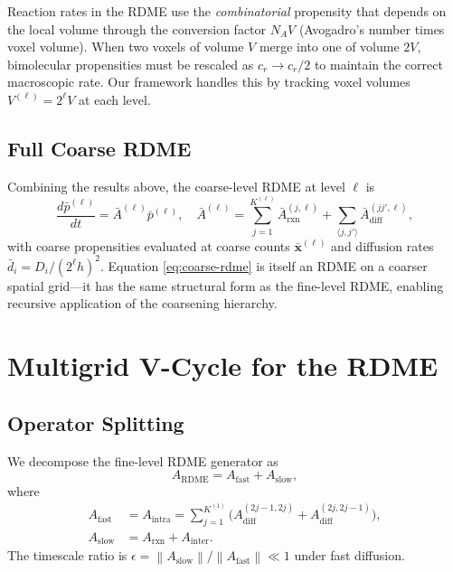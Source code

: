 \documentclass[review,onefignum,onetabnum]{siamart171218}
\newcommand{\bx}{\mathbf{x}}
\newcommand{\norm}[1]{\left\|#1\right\|}
\begin{document}
\begin{remark}
  \label{rem:volume-scaling}
  Reaction rates in the RDME use the \emph{combinatorial}
  propensity that depends on the local volume through the
  conversion factor $N_A V$ (Avogadro's number times voxel
  volume).  When two voxels of volume $V$ merge into one of
  volume $2V$, bimolecular propensities must be rescaled as
  $c_r \to c_r / 2$ to maintain the correct macroscopic rate.
  Our framework handles this by tracking voxel volumes
  $V^{(\ell)} = 2^\ell V$ at each level.
\end{remark}

\subsection{Full Coarse RDME}

Combining the results above, the coarse-level RDME at level
$\ell$ is
\begin{equation}
  \label{eq:coarse-rdme}
  \frac{d\bar{p}^{(\ell)}}{dt}
  = \bar{A}^{(\ell)} \bar{p}^{(\ell)},
  \quad
  \bar{A}^{(\ell)}
  = \sum_{j=1}^{K^{(\ell)}} \bar{A}_{\mathrm{rxn}}^{(j,\ell)}
    + \sum_{\langle j,j'\rangle} \bar{A}_{\mathrm{diff}}^{(jj',\ell)},
\end{equation}
with coarse propensities evaluated at coarse counts
$\bar{\bx}^{(\ell)}$ and diffusion rates $\bar{d}_i = D_i/(2^\ell h)^2$.
Equation \eqref{eq:coarse-rdme} is itself an RDME on a coarser
spatial grid---it has the same structural form as the fine-level
RDME, enabling recursive application of the coarsening hierarchy.

\section{Multigrid V-Cycle for the RDME}
\label{sec:vcycle}

\subsection{Operator Splitting}

We decompose the fine-level RDME generator as
\begin{equation}
  \label{eq:split}
  A_{\mathrm{RDME}} = A_{\mathrm{fast}} + A_{\mathrm{slow}},
\end{equation}
where
\begin{align}
  A_{\mathrm{fast}} &= A_{\mathrm{intra}}
    = \sum_{j=1}^{K^{(1)}}
      \bigl(A_{\mathrm{diff}}^{(2j-1,2j)} + A_{\mathrm{diff}}^{(2j,2j-1)}\bigr),\\
  A_{\mathrm{slow}} &= A_{\mathrm{rxn}} + A_{\mathrm{inter}}.
\end{align}
The timescale ratio is $\epsilon = \norm{A_{\mathrm{slow}}} / \norm{A_{\mathrm{fast}}} \ll 1$ under fast diffusion.
\end{document}
